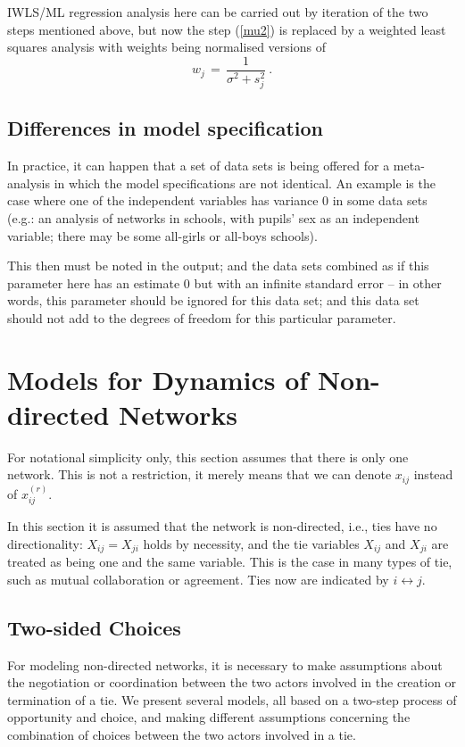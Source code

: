 \documentclass[a4paper,12pt,fleqn]{article}
\begin{document}
IWLS/ML regression analysis here can be carried out by
iteration of the two steps mentioned above, but now the step (\ref{mu2})
is replaced by a weighted least squares analysis with weights being normalised
versions of
\[
  w_j \,=\, \frac{1}{\sigma^2 + s_j^2} \ .
\]


\subsection{Differences in model specification}

In practice, it can happen that a set of data sets is being
offered for a meta-analysis in which the model specifications
are not identical. An example is the case where one of the
independent variables has variance 0 in some data sets
(e.g.: an analysis of networks in schools, with pupils' sex
as an independent variable; there may be some all-girls or
all-boys schools).

This then must be noted in the output; and the data sets combined
as if this parameter here has an estimate 0 but with an infinite
standard error -- in other words, this parameter should be ignored
for this data set;
and this data set should not add to the degrees of freedom
for this particular parameter.


\newpage
\section{Models for Dynamics of Non-directed Networks }
\label{S_nondir}

For notational simplicity only, this section assumes that there is only one network.
This is not a restriction, it merely means that we can denote
$x_{ij}$ instead  of $x^{(r)}_{ij}$.

In this section it is assumed that the network is
non-directed, i.e., ties have no directionality:
$X_{ij} = X_{ji}$ holds by necessity, and the
tie variables $X_{ij}$ and $X_{ji}$ are treated
as being one and the same variable. This is the case
in many types of tie, such as mutual collaboration or agreement.
Ties now are indicated by $i \leftrightarrow j$.

\subsection{Two-sided Choices}
For modeling non-directed networks, it is necessary to make
assumptions about the negotiation or coordination between
the two actors involved in the creation or termination of a tie.
We present several models, all based on a two-step process of
opportunity and choice, and making different assumptions
concerning the combination of choices between the two actors
involved in a tie.
\end{document}
